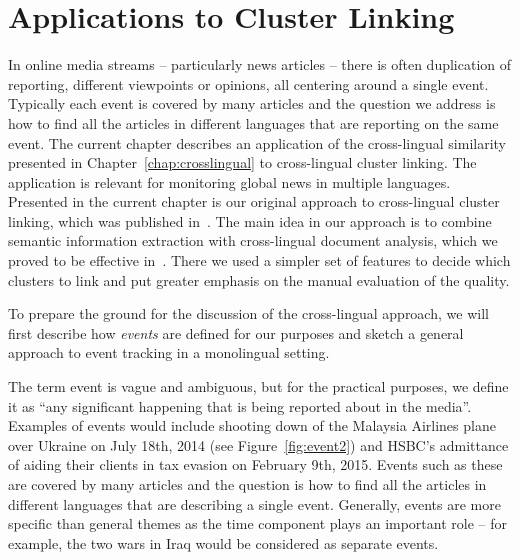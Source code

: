 %
\chapter{Applications to Cluster Linking}\label{chap:applications}

In online media streams -- particularly news articles -- there is often duplication of reporting,
different viewpoints or opinions, all centering around a single event. Typically each event is covered by many articles
and the question we address is how to find all the articles in different languages that are reporting on the same event.
The current chapter describes an application of the cross-lingual similarity presented in Chapter~\ref{chap:crosslingual}
to cross-lingual cluster linking. The application is relevant for monitoring global news in multiple languages.
Presented in the current chapter is our original approach to cross-lingual cluster linking,
which was published in~\cite{rupnikJAIR}. The main idea in our approach is to combine
semantic information extraction with cross-lingual document analysis, which we proved to be
effective in~\cite{Belyaeva201564}. There we used a simpler set of features to
decide which clusters to link and put greater emphasis on the manual evaluation of the quality.

To prepare the ground for the discussion of the cross-lingual approach, we will first
describe how \emph{events} are defined for our purposes and
sketch a general approach to event tracking in a monolingual setting.

The term event is vague and ambiguous, but for the practical purposes, we define
it as ``any significant happening that is being reported about in the media''.
Examples of events would include shooting down of the Malaysia Airlines plane over
Ukraine on July 18th, 2014 (see Figure~\ref{fig:event2}) and HSBC's admittance of
aiding their clients in tax evasion on February 9th, 2015. Events such as these are
covered by many articles and the question is how to find all the articles in
different languages that are describing a single event. Generally, events are more
specific than general themes as the time component plays an important role --
for example, the two wars in Iraq would be considered as separate events.

